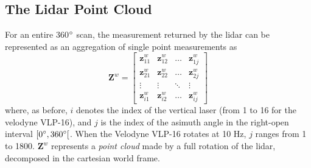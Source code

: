 \subsection{The Lidar Point Cloud}
For an entire 360$\degree$ scan, the measurement returned by the lidar can be represented as an aggregation of single point measurements as
\begin{equation}
\mathbf{Z}^w=\begin{bmatrix}
\mathbf{z}^{w}_{11} & \mathbf{z}^{w}_{12} & \dots & \mathbf{z}^{w}_{1j}\\
\mathbf{z}^{w}_{21} & \mathbf{z}^{w}_{22} & \dots & \mathbf{z}^{w}_{2j}\\
\vdots & \vdots & \ddots & \vdots \\
\mathbf{z}^{w}_{i1} & \mathbf{z}^{w}_{i2} & \dots & \mathbf{z}^{w}_{ij}
\end{bmatrix}
\end{equation}
where, as before, $i$ denotes the index of the vertical laser (from 1 to 16 for the velodyne VLP-16), and $j$ is the index of the asimuth angle in the right-open interval $\interval[open right]{0\degree}{360\degree}$. When the Velodyne VLP-16 rotates at 10 Hz, $j$ ranges from 1 to 1800. $\mathbf{Z}^w$ represents a \textit{point cloud} made by a full rotation of the lidar, decomposed in the cartesian world frame.


\cleardoublepage